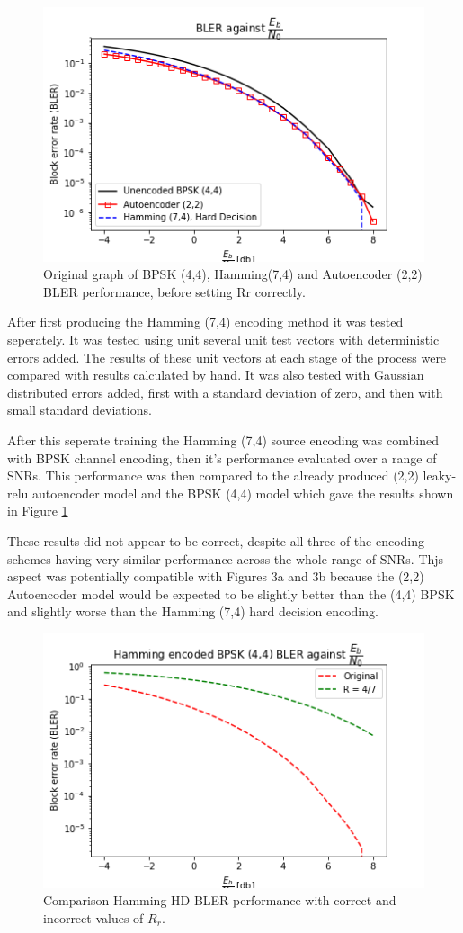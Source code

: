 \documentclass[12pt,onecolumn,letterpaper]{article}
\newcommand\genfigsize{0.5}
\begin{document}
\begin{figure}
   \centering
   \includegraphics[width=0.6\linewidth]{figures/bler_vs_eb_only_three.png}
   \caption{Original graph of BPSK (4,4), Hamming(7,4) and Autoencoder (2,2) BLER performance, before setting Rr correctly.}
   \label{fig:BlerOriginalHammingBpskAe22}
\end{figure}

After first producing the Hamming (7,4) encoding method it was tested seperately. It was tested using unit several unit test vectors with deterministic errors added. The results of these unit vectors at each stage of the process were compared with results calculated by hand. It was also tested with Gaussian distributed errors added, first with a standard deviation of zero, and then with small standard deviations.

After this seperate training the Hamming (7,4) source encoding was combined with BPSK channel encoding, then it's performance evaluated over a range of SNRs. This performance was then compared to the already produced (2,2) leaky-relu autoencoder model and the BPSK (4,4) model which gave the results shown in Figure \ref{fig:BlerOriginalHammingBpskAe22}


These results did not appear to be correct, despite all three of the encoding schemes having very similar performance across the whole range of SNRs. Thjs aspect was potentially compatible with Figures 3a and 3b because the (2,2) Autoencoder model would be expected to be slightly better than the (4,4) BPSK and slightly worse than the Hamming (7,4) hard decision encoding.

\begin{figure}
   \centering
   \includegraphics[width=\genfigsize\linewidth]{figures/hamming_correct_Rr_comparison.png}
   \caption{Comparison Hamming HD BLER performance with correct and incorrect values of $R_r$.}
   \label{fig:HammingCorrectRrComp}
\end{figure}
\end{document}
